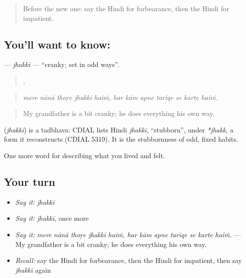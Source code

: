 \label{lesson:HI-C468-jhakki}



\begin{quote}
Before the new one: say the Hindi for forbearance, then the Hindi for impatient.
\end{quote}

\subsection*{You'll want to know: }
\textbf{} — \emph{jhakkī} — \textquotedblleft{}cranky; set in odd ways\textquotedblright{}.

\begin{quote}
    ,       
\end{quote}

\begin{quote}
\emph{mere nānā thoṛe jhakkī haiṁ, har kām apne tarīqe se karte haiṁ.}
\end{quote}

\begin{quote}
My grandfather is a bit cranky; he does everything his own way.
\end{quote}

\begin{cousinweb}
\textbf{} (\emph{jhakkī}) is a tadbhava: CDIAL lists Hindi \emph{jhakkī}, \textquotedblleft{}stubborn\textquotedblright{}, under \emph{*jhakk}, a form it reconstructs (CDIAL 5319). It is the stubbornness of odd, fixed habits.
\end{cousinweb}

\begin{grammarlens}[title={What you've built}]
One more word for describing what you lived and felt.
\end{grammarlens}

\subsection*{Your turn}
\begin{itemize}
\raggedright
  \item \emph{Say it:} \emph{jhakkī}
  \item \emph{Say it:} \emph{jhakkī}, once more
  \item \emph{Say it:} \emph{mere nānā thoṛe jhakkī haiṁ, har kām apne tarīqe se karte haiṁ.} — My grandfather is a bit cranky; he does everything his own way.
  \item \emph{Recall:} say the Hindi for forbearance, then the Hindi for impatient, then say \emph{jhakkī} again
\end{itemize}

